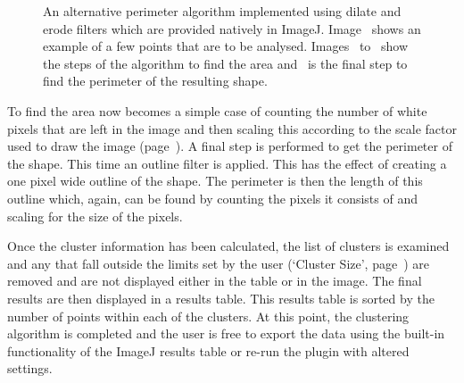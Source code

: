 \begin{figure}[tbh]
\begin{subfigure}[b]{2cm}
		\caption{}\label{fig:de7}
	\end{subfigure}
	\caption[Perimeter algorithm using dilate and erode.]{An alternative
		perimeter algorithm implemented using dilate and erode filters which
		are provided natively in ImageJ. Image~ shows an
		example of a few points that are to be analysed.
		Images~ to~ show the steps of the
		algorithm to find the area and~ is the final step to
		find the perimeter of the resulting shape.}\label{fig:dilate-erode}
\end{figure}

To find the area now becomes a simple case of counting the number of white
pixels that are left in the image and then scaling this according to the scale
factor used to draw the image (page~\pageref{it:scale}). A final step is
performed to get the perimeter of the shape. This time an outline filter is
applied. This has the effect of creating a one pixel wide outline of the shape.
The perimeter is then the length of this outline which, again, can be found by
counting the pixels it consists of and scaling for the size of the pixels.

Once the cluster information has been calculated, the list of clusters is
examined and any that fall outside the limits set by the user (`Cluster Size',
page~\pageref{it:cluster-size}) are removed and are not displayed either in the
table or in the image. The final results are then  displayed in a results
table. This results table is sorted by the number of points within each of the
clusters. At this point, the clustering algorithm is completed and the user is
free to export the data using the built-in functionality of the ImageJ results
table or re-run the plugin with altered settings.
